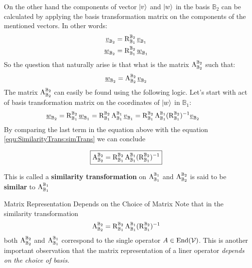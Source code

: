On the other hand the components of vector $ \ket{v} $ and $ \ket{w} $ in the basis $ \mathbb{B}_2 $ can be calculated by applying the basis transformation matrix on the components of the mentioned vectors. In other words:
\begin{equation}
	\begin{split}
		\underline{v}_{\mathbb{B}_2}  &= \operatorname{R}_{\mathbb{B}_1}^{\mathbb{B}_2} \underline{v}_{\mathbb{B}_1} \\
		\underline{w}_{\mathbb{B}_2}  &= \operatorname{R}_{\mathbb{B}_1}^{\mathbb{B}_2} \underline{w}_{\mathbb{B}_1} 
	\end{split}
\end{equation}
So the question that naturally arise is that what is the matrix $\operatorname{A}_{\mathbb{B}_2}^{\mathbb{B}_2} $ such that:
\begin{equation}
	\underline{w}_{\mathbb{B}_2} = \operatorname{A}_{\mathbb{B}_2}^{\mathbb{B}_2}  \underline{v}_{\mathbb{B}_2} 
	\label{equ:SimilarityTrans:simTrans}
\end{equation}
The matrix $ \operatorname{A}_{\mathbb{B}_2}^{\mathbb{B}_2}  $ can easily be found using the following logic. Let's start with act of basis transformation matrix on the coordinates of $ \ket{w} $ in $ \mathbb{B}_1 $:
\begin{align*}
		\underline{w}_{\mathbb{B}_2}  &= 
		\operatorname{R}_{\mathbb{B}_1}^{\mathbb{B}_2} \underline{w}_{\mathbb{B}_1} = 
		\operatorname{R}_{\mathbb{B}_1}^{\mathbb{B}_2} \operatorname{A}_{\mathbb{B}_1}^{\mathbb{B}_1} \underline{v}_{\mathbb{B}_1}  = 
		\operatorname{R}_{\mathbb{B}_1}^{\mathbb{B}_2} \operatorname{A}_{\mathbb{B}_1}^{\mathbb{B}_1} (\operatorname{R}_{\mathbb{B}_1}^{\mathbb{B}_2})^{-1} \underline{v}_{\mathbb{B}_2}
\end{align*}
By comparing the last term in the equation above with the equation \ref{equ:SimilarityTrans:simTrans} we can conclude
\begin{LARGE}
	\begin{equation}
		\boxed{
			\operatorname{A}_{\mathbb{B}_2}^{\mathbb{B}_2} = \operatorname{R}_{\mathbb{B}_1}^{\mathbb{B}_2} \operatorname{A}_{\mathbb{B}_1}^{\mathbb{B}_1} (\operatorname{R}_{\mathbb{B}_1}^{\mathbb{B}_2})^{-1} 
		}
	\end{equation}
	\label{equ:changeOfBasis_compact}
\end{LARGE}
This is called a \textbf{similarity transformation} on $ \operatorname{A}_{\mathbb{B}_{1}}^{\mathbb{B}_{1}} $ and $ \operatorname{A}_{\mathbb{B}_{2}}^{\mathbb{B}_{2}} $ is said to be \textbf{similar} to $ \operatorname{A}_{\mathbb{B}_{1}}^{\mathbb{B}_{1}} $ 

\begin{obsbox}{Matrix Representation Depends on the Choice of Matrix}
	Note that in the similarity transformation 
	\[ \operatorname{A}_{\mathbb{B}_2}^{\mathbb{B}_2} = \operatorname{R}_{\mathbb{B}_1}^{\mathbb{B}_2} \operatorname{A}_{\mathbb{B}_1}^{\mathbb{B}_1} (\operatorname{R}_{\mathbb{B}_1}^{\mathbb{B}_2})^{-1}  \] 
	both $\operatorname{A}_{\mathbb{B}_2}^{\mathbb{B}_2} $ and $\operatorname{A}_{\mathbb{B}_1}^{\mathbb{B}_1} $ correspond to the single operator $ A \in \operatorname{End}(\mathcal{V}) $. This is another important observation that the matrix representation of a liner operator \emph{depends on the choice of basis.}
\end{obsbox}

